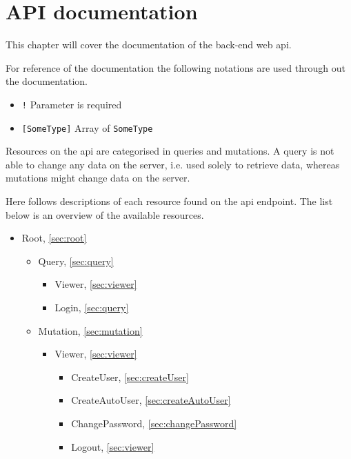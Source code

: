 \chapter{API documentation}
This chapter will cover the documentation of the back-end web \gls{api}.

For reference of the  documentation \citep{graphql:typesystem} the following notations are used through out the documentation.

\begin{itemize}  
\item \verb+!+ Parameter is required
\item \verb+[SomeType]+ Array of \verb+SomeType+
\end{itemize}

Resources on the \gls{api} are categorised in queries and mutations.
A query is not able to change any data on the server, i.e. used solely to retrieve data, whereas mutations might change data on the server.

Here follows descriptions of each resource found on the \gls{api} endpoint.
The list below is an overview of the available resources.

\begin{itemize}
\item Root, \ref{sec:root}
	\begin{itemize}
	\item Query, \ref{sec:query}
	    \begin{itemize}
	    \item Viewer, \ref{sec:viewer}
	    \item Login, \ref{sec:query}
	    \end{itemize}
	\item Mutation, \ref{sec:mutation}
	    \begin{itemize}
	    \item Viewer, \ref{sec:viewer}
		    \begin{itemize}
		    \item CreateUser, \ref{sec:createUser}
		    \item CreateAutoUser, \ref{sec:createAutoUser}
		    \item ChangePassword, \ref{sec:changePassword}
            \item Logout, \ref{sec:viewer}
		    \end{itemize}
	    \end{itemize}
	\end{itemize}
\end{itemize}

